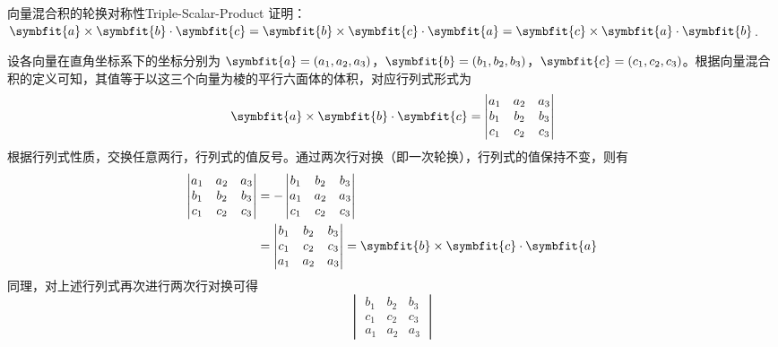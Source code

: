 \begin{problem}{向量混合积的轮换对称性}{Triple-Scalar-Product}
    证明：$\symbfit{a} \times \symbfit{b} \cdot \symbfit{c} = \symbfit{b} \times \symbfit{c} \cdot \symbfit{a} = \symbfit{c} \times \symbfit{a} \cdot \symbfit{b}$.
\end{problem}

\begin{myproof}
    设各向量在直角坐标系下的坐标分别为 $\symbfit{a} = (a_1, a_2, a_3)$，$\symbfit{b} = (b_1, b_2, b_3)$，$\symbfit{c} = (c_1, c_2, c_3)$。根据向量混合积的定义可知，其值等于以这三个向量为棱的平行六面体的体积，对应行列式形式为
    \begin{equation*}
        \symbfit{a} \times \symbfit{b} \cdot \symbfit{c} = \begin{vmatrix} a_1 & a_2 & a_3 \\ b_1 & b_2 & b_3 \\ c_1 & c_2 & c_3 \end{vmatrix}
    \end{equation*}
    根据行列式性质，交换任意两行，行列式的值反号。通过两次行对换（即一次轮换），行列式的值保持不变，则有
    \begin{equation*}
        \begin{aligned}
            \begin{vmatrix} a_1 & a_2 & a_3 \\ b_1 & b_2 & b_3 \\ c_1 & c_2 & c_3 \end{vmatrix}
             & = - \begin{vmatrix} b_1 & b_2 & b_3 \\ a_1 & a_2 & a_3 \\ c_1 & c_2 & c_3 \end{vmatrix}                                                  \\
             & = \begin{vmatrix} b_1 & b_2 & b_3 \\ c_1 & c_2 & c_3 \\ a_1 & a_2 & a_3 \end{vmatrix} = \symbfit{b} \times \symbfit{c} \cdot \symbfit{a}
        \end{aligned}
    \end{equation*}
    同理，对上述行列式再次进行两次行对换可得
    \begin{equation*}
        \begin{vmatrix} b_1 & b_2 & b_3 \\ c_1 & c_2 & c_3 \\ a_1 & a_2 & a_3 \end{vmatrix}

\end{equation*}
\end{myproof}
